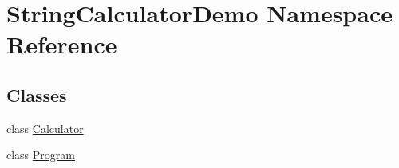 \hypertarget{namespace_string_calculator_demo}{}\section{String\+Calculator\+Demo Namespace Reference}
\label{namespace_string_calculator_demo}
\subsection*{Classes}
\begin{DoxyCompactItemize}
\item 
class \hyperlink{class_string_calculator_demo_1_1_calculator}{Calculator}
\item 
class \hyperlink{class_string_calculator_demo_1_1_program}{Program}
\end{DoxyCompactItemize}
